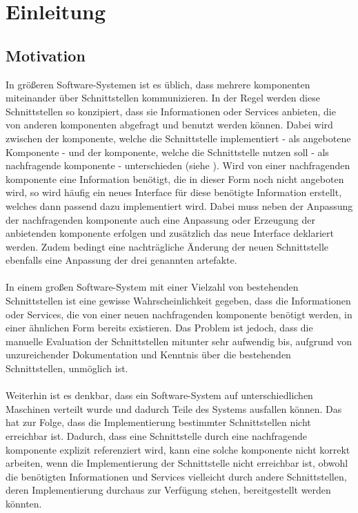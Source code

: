 \chapter{Einleitung}
\section{Motivation}
In größeren Software-Systemen ist es üblich, dass mehrere \gls{komponente}n miteinander über Schnittstellen kommunizieren. In der Regel werden diese Schnittstellen so konzipiert, dass sie Informationen oder Services anbieten, die von anderen \gls{komponente}n abgefragt und benutzt werden können. Dabei wird zwischen der \gls{komponente}, welche die Schnittstelle implementiert - als angebotene Komponente - und der \gls{komponente}, welche die Schnittstelle nutzen soll - als nachfragende \gls{komponente} - unterschieden (siehe ). 
\noindent
Wird von einer nachfragenden \gls{komponente} eine Information benötigt, die in dieser Form noch nicht angeboten wird, so wird häufig ein neues \Gls{Interface} für diese benötigte Information erstellt, welches dann passend dazu implementiert wird. Dabei muss neben der Anpassung der nachfragenden \gls{komponente} auch eine Anpassung oder Erzeugung der anbietenden \gls{komponente} erfolgen und zusätzlich das neue \Gls{Interface} deklariert werden. Zudem bedingt eine nachträgliche Änderung der neuen Schnittstelle ebenfalls eine Anpassung der drei genannten \gls{artefakt}e.\\\\
In einem großen Software-System mit einer Vielzahl von bestehenden Schnittstellen ist eine gewisse Wahrscheinlichkeit gegeben, dass die Informationen oder Services, die von einer neuen nachfragenden \gls{komponente} benötigt werden, in einer ähnlichen Form bereits existieren. Das Problem ist jedoch, dass die manuelle Evaluation der Schnittstellen mitunter sehr aufwendig bis, aufgrund von unzureichender Dokumentation und Kenntnis über die bestehenden Schnittstellen, unmöglich ist.
\\\\
Weiterhin ist es denkbar, dass ein Software-System auf unterschiedlichen Maschinen verteilt wurde und dadurch Teile des Systems ausfallen können. Das hat zur Folge, dass die Implementierung bestimmter Schnittstellen nicht erreichbar ist. Dadurch, dass eine Schnittstelle durch eine nachfragende \gls{komponente} explizit referenziert wird, kann eine solche \gls{komponente} nicht korrekt arbeiten, wenn die Implementierung der Schnittstelle nicht erreichbar ist, obwohl die benötigten Informationen und Services vielleicht durch andere Schnittstellen, deren Implementierung durchaus zur Verfügung stehen, bereitgestellt werden könnten.
